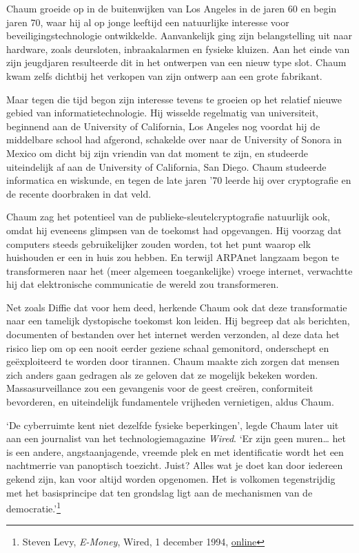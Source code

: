\documentclass[
  a5paper,
  smalldemyvopaper,11pt,twoside,onecolumn,openright,extrafontsizes,
hidelinks]{memoir}
\begin{document}
Chaum groeide op in de buitenwijken van Los Angeles in de jaren 60 en
begin jaren 70, waar hij al op jonge leeftijd een natuurlijke interesse
voor beveiligingstechnologie ontwikkelde. Aanvankelijk ging zijn
belangstelling uit naar hardware, zoals deursloten, inbraakalarmen en
fysieke kluizen. Aan het einde van zijn jeugdjaren resulteerde dit in
het ontwerpen van een nieuw type slot. Chaum kwam zelfs dichtbij het
verkopen van zijn ontwerp aan een grote fabrikant.

Maar tegen die tijd begon zijn interesse tevens te groeien op het
relatief nieuwe gebied van informatietechnologie. Hij wisselde
regelmatig van universiteit, beginnend aan de University of California,
Los Angeles nog voordat hij de middelbare school had afgerond, schakelde
over naar de University of Sonora in Mexico om dicht bij zijn vriendin
van dat moment te zijn, en studeerde uiteindelijk af aan de University
of California, San Diego. Chaum studeerde informatica en wiskunde, en
tegen de late jaren '70 leerde hij over cryptografie en de recente
doorbraken in dat veld.

Chaum zag het potentieel van de publieke-sleutelcryptografie natuurlijk
ook, omdat hij eveneens glimpsen van de toekomst had opgevangen. Hij
voorzag dat computers steeds gebruikelijker zouden worden, tot het punt
waarop elk huishouden er een in huis zou hebben. En terwijl ARPAnet
langzaam begon te transformeren naar het (meer algemeen toegankelijke)
vroege internet, verwachtte hij dat elektronische communicatie de wereld
zou transformeren.

Net zoals Diffie dat voor hem deed, herkende Chaum ook dat deze
transformatie naar een tamelijk dystopische toekomst kon leiden. Hij
begreep dat als berichten, documenten of bestanden over het internet
werden verzonden, al deze data het risico liep om op een nooit eerder
geziene schaal gemonitord, onderschept en geëxploiteerd te worden door
tirannen. Chaum maakte zich zorgen dat mensen zich anders gaan gedragen
als ze geloven dat ze mogelijk bekeken worden. Massasurveillance zou een
gevangenis voor de geest creëren, conformiteit bevorderen, en
uiteindelijk fundamentele vrijheden vernietigen, aldus Chaum.

`De cyberruimte kent niet dezelfde fysieke beperkingen', legde Chaum
later uit aan een journalist van het technologiemagazine \emph{Wired}.
`Er zijn geen muren\ldots{} het is een andere, angstaanjagende, vreemde
plek en met identificatie wordt het een nachtmerrie van panoptisch
toezicht. Juist? Alles wat je doet kan door iedereen gekend zijn, kan
voor altijd worden opgenomen. Het is volkomen tegenstrijdig met het
basisprincipe dat ten grondslag ligt aan de mechanismen van de
democratie.'\footnote{Steven Levy, \emph{E-Money}, Wired, 1 december
  1994, \href{https://www.wired.com/1994/12/emoney/.}{online}}
\end{document}
